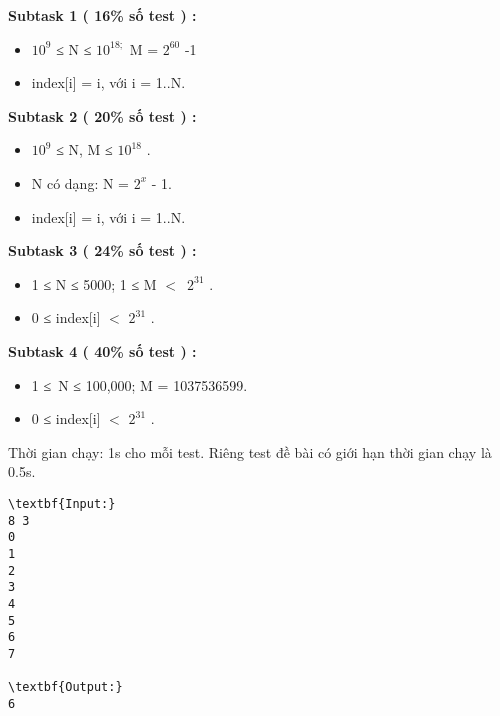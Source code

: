 \textbf{Subtask 1 ( 16\% số test ) : }
\begin{itemize}
	\item 

$10^{9}$ ≤ N ≤ $10^{18;}$ M = $2^{60}$ -1
	\item 

index[i] = i, với i = 1..N.
\end{itemize}

\textbf{Subtask 2 ( 20\% số test ) : }
\begin{itemize}
	\item 

$10^{9}$ ≤ N, M ≤ $10^{18}$ .
	\item 

N có dạng: N = $2^{x}$ - 1.
	\item 

index[i] = i, với i = 1..N.
\end{itemize}

\textbf{Subtask 3 ( 24\% số test ) : }
\begin{itemize}
	\item 

1 ≤ N ≤ 5000; 1 ≤ M $<$ $2^{31}$ .
	\item 

0 ≤ index[i] $<$ $2^{31}$ .
\end{itemize}

\textbf{Subtask 4 ( 40\% số test ) : }
\begin{itemize}
	\item 

1 ≤ N ≤ 100,000; M = 1037536599.
	\item 

0 ≤ index[i] $<$ $2^{31}$ .
\end{itemize}

Thời gian chạy: 1s cho mỗi test. Riêng test đề bài có giới hạn thời gian chạy là 0.5s.
\begin{verbatim}
\textbf{Input:}
8 3
0
1
2
3
4
5
6
7

\textbf{Output:}
6
\end{verbatim}